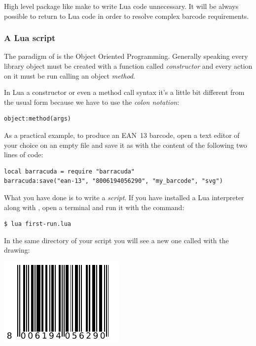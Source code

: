 \documentclass[11pt,a4paper]{article}
\begin{document}
High level package like  make to write Lua code unnecessary.
It will be always possible to return to Lua code in order to resolve complex
barcode requirements.


\subsubsection{A Lua script}

The paradigm of \brcd{} is the Object Oriented Programming. Generally speaking
every library object must be created with a function called \emph{constructor}
and every action on it must be run calling an object \emph{method}.

In Lua a constructor or even a method call syntax it's a little bit different
from the usual form because we have to use the \emph{colon notation}:
\begin{BVerbatim}
object:method(args)
\end{BVerbatim}

As a practical example, to produce an EAN~13 barcode, open a text editor of your
choice on an empty file and save it as  with the content of
the following two lines of code:
\begin{tcolorbox}[
    title={\code{first-run.lua}}
]
\begin{BVerbatim}
local barracuda = require "barracuda"
barracuda:save("ean-13", "8006194056290", "my_barcode", "svg")
\end{BVerbatim}
\end{tcolorbox}

What you have done is to write a \emph{script}. If you have installed a Lua
interpreter along with \brcd{}, open a terminal and run it with the command:
\begin{BVerbatim}
$ lua first-run.lua
\end{BVerbatim}

In the same directory of your script you will see a new one called
 with the drawing:
\begin{center}
\includegraphics{image/8006194056290}
\end{center}
\end{document}
